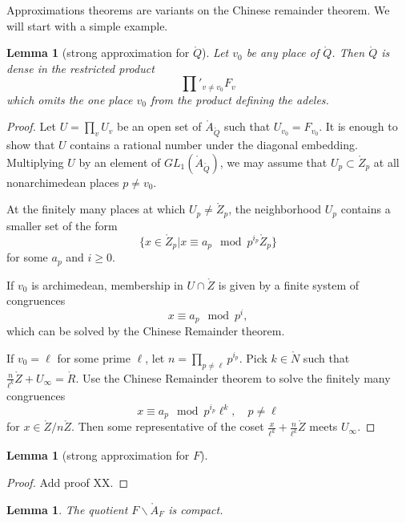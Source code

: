 \documentclass{amsart}
\newtheorem{lemma}[equation]{Lemma}
\def\RR{\ring{R}}
\def\ZZ{\ring{Z}}
\def\QQ{\ring{Q}}
\def\AA{\ring{A}}
\begin{document}
Approximations theorems are variants on the Chinese remainder theorem.  We will
start with a simple example.

\begin{lemma}[strong approximation for $\QQ$]
Let $v_0$ be any place of $\QQ$.  Then $\QQ$ is dense in the restricted product
\[
\prod'_{v\ne v_0} F_v
\]
which omits the one place $v_0$ from the product defining the adeles.
\end{lemma}

\begin{proof} Let $U=\prod_v U_v$ be an open set of $\AA_\QQ$ such that $U_{v_0}= F_{v_0}$.
It is enough to show that $U$ contains a rational number under the diagonal embedding.  Multiplying
$U$ by an element of $GL_1(\AA_\QQ)$, we may assume that $U_p \subset \ring{Z}_p$ at all
nonarchimedean places $p\ne v_0$.

At the finitely many places at which $U_p\ne \ring{Z}_p$, 
the neighborhood $U_p$ contains a smaller set of the form
\[
\{x \in \ZZ_p |  x \equiv a_p \mod p^{i_p} \ZZ_p \}
\]
for some $a_p$ and $i\ge 0$.

If $v_0$ is archimedean, membership in $U\cap \ZZ$ is given by a finite system of congruences
\[
x \equiv a_p \mod p^i,
\]
which can be solved by the Chinese Remainder theorem.

If $v_0=\ell$ for some prime $\ell$,  let $n=\prod_{p\ne \ell } p^{i_p}$.
Pick $k\in \ring{N}$ such that
$\frac{n}{\ell^k}\ZZ + U_\infty = \RR$.
Use the Chinese Remainder theorem to solve the finitely many congruences
\[
x \equiv a_p \mod p^{i_p} \ell^k,\quad p\ne \ell
\]
for $x \in \ZZ/n\ZZ$.    Then some representative of the coset 
$\frac{x}{\ell^k} + \frac{n}{\ell^k}\ZZ$ 
meets $U_\infty$.
\end{proof}

\begin{lemma}[strong approximation for $F$]
\end{lemma}

\begin{proof} Add proof XX.
\end{proof}


\begin{lemma}  The quotient $F\backslash \AA_F$ is compact.
\end{lemma}
\end{document}
